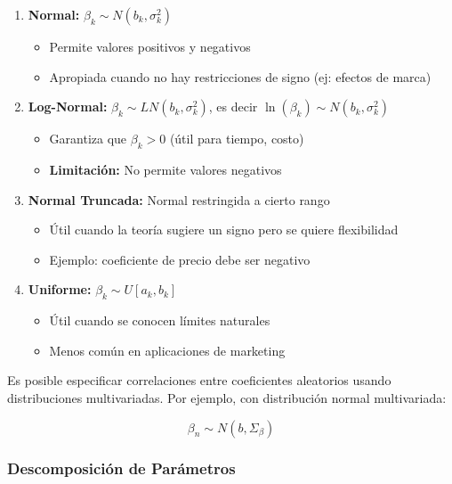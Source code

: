 \documentclass[
]{book}
\providecommand{\tightlist}{%
  \setlength{\itemsep}{0pt}\setlength{\parskip}{0pt}}
\begin{document}
\begin{enumerate}
\def\labelenumi{\arabic{enumi}.}
\tightlist
\item
  \textbf{Normal:} \(\beta_k \sim N(b_k, \sigma^2_k)\)

  \begin{itemize}
  \tightlist
  \item
    Permite valores positivos y negativos
  \item
    Apropiada cuando no hay restricciones de signo (ej: efectos de marca)
  \end{itemize}
\item
  \textbf{Log-Normal:} \(\beta_k \sim LN(b_k, \sigma^2_k)\), es decir \(\ln(\beta_k) \sim N(b_k, \sigma^2_k)\)

  \begin{itemize}
  \tightlist
  \item
    Garantiza que \(\beta_k > 0\) (útil para tiempo, costo)
  \item
    \textbf{Limitación:} No permite valores negativos
  \end{itemize}
\item
  \textbf{Normal Truncada:} Normal restringida a cierto rango

  \begin{itemize}
  \tightlist
  \item
    Útil cuando la teoría sugiere un signo pero se quiere flexibilidad
  \item
    Ejemplo: coeficiente de precio debe ser negativo
  \end{itemize}
\item
  \textbf{Uniforme:} \(\beta_k \sim U[a_k, b_k]\)

  \begin{itemize}
  \tightlist
  \item
    Útil cuando se conocen límites naturales
  \item
    Menos común en aplicaciones de marketing
  \end{itemize}
\end{enumerate}

Es posible especificar correlaciones entre coeficientes aleatorios usando distribuciones multivariadas. Por ejemplo, con distribución normal multivariada:

\[\beta_n \sim N(b, \Sigma_\beta)\]

\hypertarget{descomposiciuxf3n-de-paruxe1metros}{%
\subsubsection{Descomposición de Parámetros}\label{descomposiciuxf3n-de-paruxe1metros}}
\end{document}
